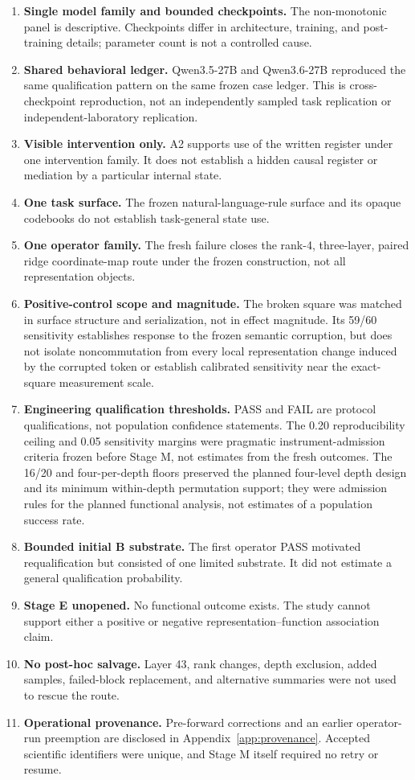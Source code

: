 \documentclass[10pt,a4paper]{article}
\begin{document}
\begin{enumerate}
\item \textbf{Single model family and bounded checkpoints.} The non-monotonic panel is descriptive. Checkpoints differ in architecture, training, and post-training details; parameter count is not a controlled cause.
\item \textbf{Shared behavioral ledger.} Qwen3.5-27B and Qwen3.6-27B reproduced the same qualification pattern on the same frozen case ledger. This is cross-checkpoint reproduction, not an independently sampled task replication or independent-laboratory replication.
\item \textbf{Visible intervention only.} A2 supports use of the written register under one intervention family. It does not establish a hidden causal register or mediation by a particular internal state.
\item \textbf{One task surface.} The frozen natural-language-rule surface and its opaque codebooks do not establish task-general state use.
\item \textbf{One operator family.} The fresh failure closes the rank-4, three-layer, paired ridge coordinate-map route under the frozen construction, not all representation objects.
\item \textbf{Positive-control scope and magnitude.} The broken square was matched in surface structure and serialization, not in effect magnitude. Its 59/60 sensitivity establishes response to the frozen semantic corruption, but does not isolate noncommutation from every local representation change induced by the corrupted token or establish calibrated sensitivity near the exact-square measurement scale.
\item \textbf{Engineering qualification thresholds.} PASS and FAIL are protocol qualifications, not population confidence statements. The 0.20 reproducibility ceiling and 0.05 sensitivity margins were pragmatic instrument-admission criteria frozen before Stage M, not estimates from the fresh outcomes. The 16/20 and four-per-depth floors preserved the planned four-level depth design and its minimum within-depth permutation support; they were admission rules for the planned functional analysis, not estimates of a population success rate.
\item \textbf{Bounded initial B substrate.} The first operator PASS motivated requalification but consisted of one limited substrate. It did not estimate a general qualification probability.
\item \textbf{Stage E unopened.} No functional outcome exists. The study cannot support either a positive or negative representation--function association claim.
\item \textbf{No post-hoc salvage.} Layer 43, rank changes, depth exclusion, added samples, failed-block replacement, and alternative summaries were not used to rescue the route.
\item \textbf{Operational provenance.} Pre-forward corrections and an earlier operator-run preemption are disclosed in Appendix~\ref{app:provenance}. Accepted scientific identifiers were unique, and Stage M itself required no retry or resume.
\end{enumerate}
\end{document}
